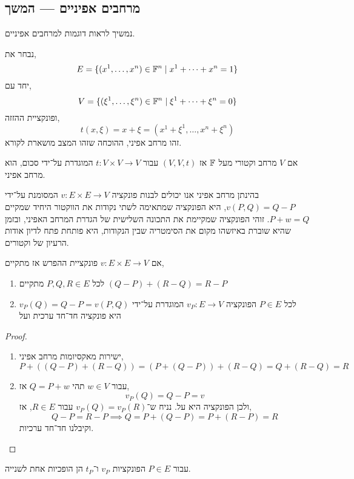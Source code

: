 \subsection{מרחבים אפיניים --- המשך}
נמשיך לראות דוגמות למרחבים אפיניים.
\begin{example}
	נבחר את,
	\[
		E = \{ (x^1, \ldots, x^n) \in \mathbb{F}^n \mid x^1 + \cdots + x^n = 1 \}
	\]
	יחד עם,
	\[
		V = \{ (\xi^1, \ldots, \xi^n) \in \mathbb{F}^n \mid \xi^1 + \cdots + \xi^n = 0 \}
	\]
	ופונקציית ההזזה,
	\[
		t(x, \xi)
		= x + \xi
		= (x^1 + \xi^1, \ldots, x^n + \xi^n)
	\]
	זהו מרחב אפיני, ההוכחה שזהו המצב מושארת לקורא.
\end{example}
\begin{example}
	אם $V$ מרחב וקטורי מעל $\mathbb{F}$ אז $(V, V, t)$ עבור $t : V \times V \to V$ המוגדרת על־ידי סכום, הוא מרחב אפיני.
\end{example}
בהינתן מרחב אפיני אנו יכולים לבנות פונקציה $v : E \times E \to V$ המסומנת על־ידי $v(P, Q) = Q - P$, היא הפונקציה שמתאימה לשתי נקודות את הווקטור היחיד שמקיים $P + w = Q$.
זוהי הפונקציה שמקיימת את התכונה השלישית של הגדרת המרחב האפיני, ובזמן שהיא שוברת באיזשהו מקום את הסימטריה שבין הנקודות, היא פותחת פתח לדיון אודות הרעיון של וקטורים.
\begin{proposition}
	אם $v : E \times E \to V$ פונקציית ההפרש אז מתקיים,
	\begin{enumerate}
		\item לכל $P, Q, R \in E$ מתקיים $(Q - P) + (R - Q) = R - P$
		\item לכל $P \in E$ הפונקציה $v_P : E \to V$ המוגדרת על־ידי $v_P(Q) = Q - P = v(P, Q)$ היא פונקציה חד־חד ערכית ועל
	\end{enumerate}
\end{proposition}
\begin{proof}
	\begin{enumerate}
		\item ישירות מאקסיומות מרחב אפיני,
		\[
			P + ((Q - P) + (R - Q))
			= (P + (Q - P)) + (R - Q)
			= Q + (R - Q)
			= R
		\]
		\item עבור $w \in V$ תהי $Q = P + w$ אז,
			\[
				v_P(Q)
				= Q - P
				= v
			\]
			ולכן הפונקציה היא על.
			נניח ש־$v_P(Q) = v_P(R)$ עבור $R \in E$, אז,
			\[
				Q - P
				= R - P
				\implies Q = P + (Q - P)
				= P + (R - P)
				= R
			\]
			וקיבלנו חד־חד ערכיות.
			\qedhere
	\end{enumerate}
\end{proof}
\begin{proposition}
	עבור $P \in E$ הפונקציות $v_P$ ו־$t_P$ הן הופכיות אחת לשנייה.
\end{proposition}
